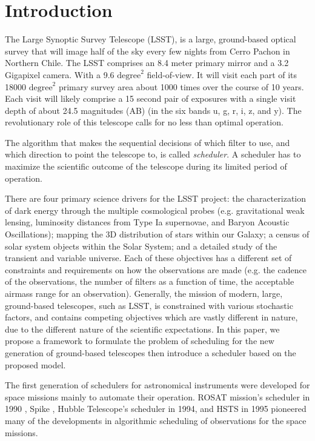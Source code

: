 \documentclass[12pt]{aastex62}
\theoremstyle{definition}
\begin{document}

\section{Introduction}
The Large Synoptic Survey Telescope (LSST), is a large,  ground-based optical survey that will image half of the sky every few nights from Cerro Pachon in Northern Chile. The LSST comprises an 8.4 meter  primary mirror and a 3.2 Gigapixel camera.  With a 9.6 $\text{degree}^2$ field-of-view. It will visit each part of its 18000 $\text{degree}^2$ primary survey area about 1000 times over the course of 10 years. Each visit will likely comprise a 15 second pair of exposures with a single visit depth of about 24.5 magnitudes (AB) (in the six bands u, g, r, i, z, and y). The revolutionary role of this telescope calls for no less than optimal operation. 

The algorithm that makes the sequential decisions of which filter to use, and which direction to point the telescope to, is called \textit{scheduler}. A scheduler has to maximize the scientific outcome of the telescope during its limited period of operation. 

There are four primary science drivers for the LSST project: the characterization of dark energy through the multiple cosmological probes (e.g. gravitational weak lensing, luminosity distances from Type Ia supernovae, and Baryon Acoustic Oscillations); mapping the 3D distribution of stars within our Galaxy; a census of solar system objects within the Solar System; and a detailed study of the transient and variable universe. Each of these objectives has a different set of constraints and requirements on how the observations are made (e.g. the cadence of the observations, the number of filters as a function of time, the acceptable airmass range for an observation). Generally, the mission of modern, large, ground-based telescopes, such as LSST, is constrained with various stochastic factors, and contains competing objectives which are vastly different in nature, due to the different nature of the scientific expectations. In this paper, we propose a framework to formulate the problem of scheduling for the new generation of ground-based telescopes then introduce a scheduler based on the proposed model.

The first generation of schedulers for astronomical instruments were developed for space missions mainly to automate their operation. ROSAT mission's scheduler in 1990 \citep{nowakovski1999using}, Spike \citep{johnston1994spike}, Hubble Telescope's scheduler in 1994, and HSTS \citep{muscettola1995automating} in 1995 pioneered many of the developments in algorithmic scheduling of observations for the space missions.
\end{document}
